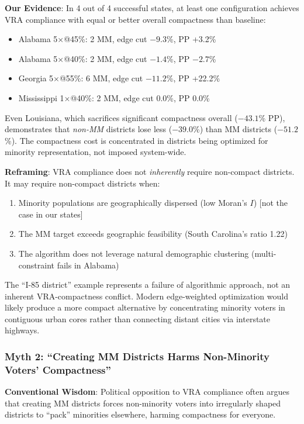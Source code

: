 \textbf{Our Evidence}: In 4 out of 4 successful states, at least one configuration achieves VRA compliance with equal or better overall compactness than baseline:
\begin{itemize}
    \item Alabama 5$\times$@45\%: 2 MM, edge cut $-9.3$\%, PP +3.2\%
    \item Alabama 5$\times$@40\%: 2 MM, edge cut $-1.4$\%, PP $-2.7$\%
    \item Georgia 5$\times$@55\%: 6 MM, edge cut $-11.2$\%, PP +22.2\%
    \item Mississippi 1$\times$@40\%: 2 MM, edge cut 0.0\%, PP 0.0\%
\end{itemize}

Even Louisiana, which sacrifices significant compactness overall ($-43.1$\% PP), demonstrates that \emph{non-MM} districts lose less ($-39.0$\%) than MM districts ($-51.2$\%). The compactness cost is concentrated in districts being optimized for minority representation, not imposed system-wide.

\textbf{Reframing}: VRA compliance does not \emph{inherently} require non-compact districts. It may require non-compact districts when:
\begin{enumerate}
    \item Minority populations are geographically dispersed (low Moran's $I$) [not the case in our states]
    \item The MM target exceeds geographic feasibility (South Carolina's ratio 1.22)
    \item The algorithm does not leverage natural demographic clustering (multi-constraint fails in Alabama)
\end{enumerate}

The ``I-85 district'' example represents a failure of algorithmic approach, not an inherent VRA-compactness conflict. Modern edge-weighted optimization would likely produce a more compact alternative by concentrating minority voters in contiguous urban cores rather than connecting distant cities via interstate highways.

\subsubsection{Myth 2: ``Creating MM Districts Harms Non-Minority Voters' Compactness''}

\textbf{Conventional Wisdom}: Political opposition to VRA compliance often argues that creating MM districts forces non-minority voters into irregularly shaped districts to ``pack'' minorities elsewhere, harming compactness for everyone.

